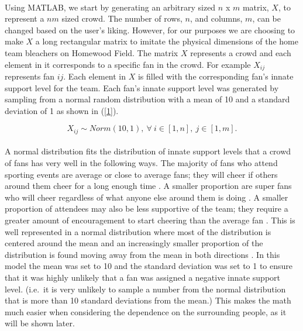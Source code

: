 \documentclass[oneside,12pt]{report}
\begin{document}
\paragraph{}
Using MATLAB, we start by generating an arbitrary sized $n$ x $m$ matrix, $X$, to represent a $nm$ sized crowd. The number of rows, $n$, and columns, $m$, can be changed based on the user's liking. However, for our purposes we are choosing to make $X$ a long rectangular matrix to imitate the physical dimensions of the home team bleachers on Homewood Field. The matrix $X$ represents a crowd and each element in it corresponds to a specific fan in the crowd. For example $X_{ij}$ represents fan $ij$. Each element in $X$ is filled with the corresponding fan's innate support level for the team. Each fan's innate support level was generated by sampling from a normal random distribution with a mean of 10 and a standard deviation of 1 as shown in (\ref{1}). 

\begin{equation}
X_{ij}\sim Norm(10,1),~\forall~i\in[1,n],~j\in[1,m].
\label{1}
\end{equation}

\paragraph{}
A normal distribution fits the distribution of innate support levels that a crowd of fans has very well in the following ways. The majority of fans who attend sporting events are average or close to average fans; they will cheer if others around them cheer for a long enough time \cite{DI2003}. A smaller proportion are super fans who will cheer regardless of what anyone else around them is doing \cite{DI2003}. A smaller proportion of attendees may also be less supportive of the team; they require a greater amount of encouragement to start cheering than the average fan \cite{DI2003}. This is well represented in a normal distribution where most of the distribution is centered around the mean and an increasingly smaller proportion of the distribution is found moving away from the mean in both directions \cite{DI2003}. In this model the mean was set to 10 and the standard deviation was set to 1 to ensure that it was highly unlikely that a fan was assigned a negative innate support level. (i.e.~it is very unlikely to sample a number from the normal distribution that is more than 10 standard deviations from the mean.) This makes the math much easier when considering the dependence on the surrounding people, as it will be shown later.
\end{document}

